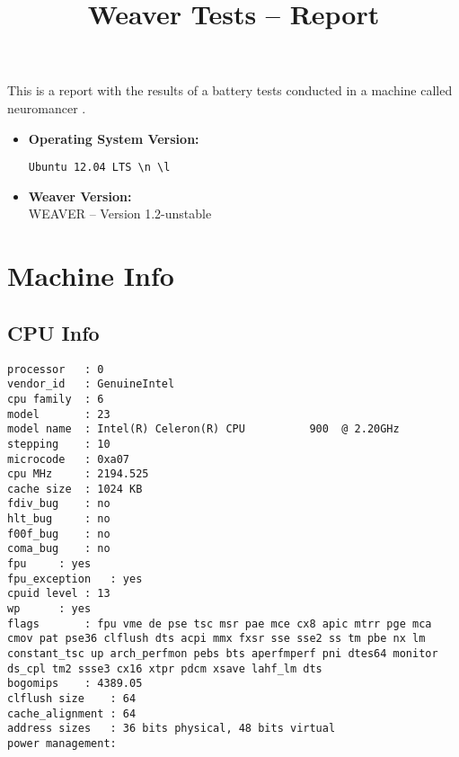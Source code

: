 \documentclass{article}
\title{Weaver Tests -- Report}
\begin{document}
\maketitle
This is a report with the results of a battery
tests conducted in a machine called 
neuromancer
.
\begin{itemize}
\item
\textbf{Operating System Version: }
\begin{verbatim}
Ubuntu 12.04 LTS \n \l

\end{verbatim}
\item
\textbf{Weaver Version: }\\
WEAVER -- Version 1.2-unstable
\end{itemize}
\section{Machine Info}
\subsection{CPU Info}
\begin{verbatim}
processor	: 0
vendor_id	: GenuineIntel
cpu family	: 6
model		: 23
model name	: Intel(R) Celeron(R) CPU          900  @ 2.20GHz
stepping	: 10
microcode	: 0xa07
cpu MHz		: 2194.525
cache size	: 1024 KB
fdiv_bug	: no
hlt_bug		: no
f00f_bug	: no
coma_bug	: no
fpu		: yes
fpu_exception	: yes
cpuid level	: 13
wp		: yes
flags		: fpu vme de pse tsc msr pae mce cx8 apic mtrr pge mca cmov pat pse36 clflush dts acpi mmx fxsr sse sse2 ss tm pbe nx lm constant_tsc up arch_perfmon pebs bts aperfmperf pni dtes64 monitor ds_cpl tm2 ssse3 cx16 xtpr pdcm xsave lahf_lm dts
bogomips	: 4389.05
clflush size	: 64
cache_alignment	: 64
address sizes	: 36 bits physical, 48 bits virtual
power management:

\end{verbatim}
\end{document}
